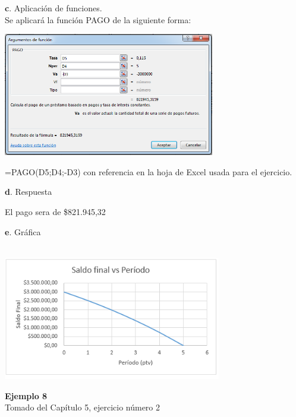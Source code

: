 \clearpage

\textbf{c}. Aplicación de funciones.
 \\
 
Se aplicará la función PAGO de la siguiente forma:     
 
 \begin{center}
	\includegraphics[height=5.4cm]{img/ch8/8_13.png}
\end{center}

=PAGO(D5;D4;-D3) con referencia en la hoja de Excel usada para el ejercicio.

\vspace{2mm}

\textbf{d}. Respuesta

\vspace{2mm}

El pago sera de \$821.945,32

\vspace{2mm}

\textbf{e}. Gráfica\\
\ \begin{center}
	\includegraphics[height=5.4cm]{img/ch8/8_14.png}
\end{center}
\vspace{4mm}
\textbf{Ejemplo 8}\\

Tomado del Capítulo 5, ejercicio número 2

\vspace{2mm}

